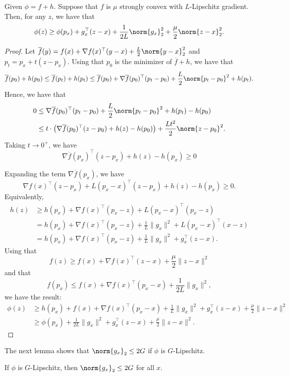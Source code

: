 \begin{thm}
\label{thm:gradient_mapping_lower_bound}Given $\phi=f+h$. Suppose
that $f$ is $\mu$ strongly convex with $L$-Lipschitz gradient.
Then, for any $z$, we have that
\[
\phi(z)\geq\phi(p_{x})+g_{x}^{\top}(z-x)+\frac{1}{2L}\norm{g_{x}}_{2}^{2}+\frac{\mu}{2}\norm{z-x}_{2}^{2}.
\]
\end{thm}

\begin{proof}
Let $\overline{f}(y)=f(x)+\nabla f(x)^{\top}(y-x)+\frac{L}{2}\norm{y-x}_{2}^{2}$
and $p_{t}=p_{x}+t(z-p_{x})$. Using that $p_{0}$ is the minimizer
of $\overline{f}+h$, we have that 
\[
\overline{f}(p_{0})+h(p_{0})\leq\overline{f}(p_{t})+h(p_{t})\leq\overline{f}(p_{0})+\nabla\overline{f}(p_{0})^{\top}(p_{t}-p_{0})+\frac{L}{2}\norm{p_{t}-p_{0}}^{2}+h(p_{t}).
\]
Hence, we have that
\begin{align*}
0 & \leq\nabla\overline{f}(p_{0})^{\top}(p_{t}-p_{0})+\frac{L}{2}\norm{p_{t}-p_{0}}^{2}+h(p_{t})-h(p_{0})\\
 & \leq t\cdot\left(\nabla\overline{f}(p_{0})^{\top}(z-p_{0})+h(z)-h(p_{0})\right)+\frac{Lt^{2}}{2}\norm{z-p_{0}}^{2}.
\end{align*}
Taking $t\rightarrow0^{+}$, we have 
\[
\nabla\overline{f}(p_{x})^{\top}(z-p_{x})+h(z)-h(p_{x})\geq0
\]

Expanding the term $\nabla\overline{f}(p_{x})$, we have
\[
\nabla f(x)^{\top}(z-p_{x})+L(p_{x}-x)^{\top}(z-p_{x})+h(z)-h(p_{x})\geq0.
\]
Equivalently,
\begin{align*}
h(z) & \geq h(p_{x})+\nabla f(x)^{\top}(p_{x}-z)+L(p_{x}-x)^{\top}(p_{x}-z)\\
 & =h(p_{x})+\nabla f(x)^{\top}(p_{x}-z)+\frac{1}{L}\|g_{x}\|^{2}+L(p_{x}-x)^{\top}(x-z)\\
 & =h(p_{x})+\nabla f(x)^{\top}(p_{x}-z)+\frac{1}{L}\|g_{x}\|^{2}+g_{x}^{\top}(z-x).
\end{align*}
Using that 
\[
f(z)\geq f(x)+\nabla f(x)^{\top}(z-x)+\frac{\mu}{2}\|z-x\|^{2}
\]
and that
\[
f(p_{x})\leq f(x)+\nabla f(x)^{\top}(p_{x}-x)+\frac{1}{2L}\|g_{x}\|^{2},
\]
we have the result:
\begin{align*}
\phi(z) & \geq h(p_{x})+f(x)+\nabla f(x)^{\top}(p_{x}-x)+\frac{1}{L}\|g_{x}\|^{2}+g_{x}^{\top}(z-x)+\frac{\mu}{2}\|z-x\|^{2}\\
 & \geq\phi(p_{x})+\frac{1}{2L}\|g_{x}\|^{2}+g_{x}^{\top}(z-x)+\frac{\mu}{2}\|z-x\|^{2}.
\end{align*}

\end{proof}
The next lemma shows that $\norm{g_{x}}_{2}\leq2G$ if $\phi$ is
$G$-Lipschitz.
\begin{lem}
\label{lem:Lipschitz_constant_g}If $\phi$ is $G$-Lipschitz, then
$\norm{g_{x}}_{2}\leq2G$ for all $x$.
\end{lem}

